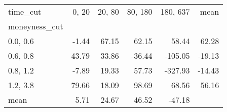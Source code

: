 \begin{tabular}{lrrrrr}
\toprule
time\_cut &  0, 20 &  20, 80 &  80, 180 &  180, 637 &   mean \\
moneyness\_cut &          &           &            &             &        \\
\midrule
0.0, 0.6    &    -1.44 &     67.15 &      62.15 &       58.44 &  62.28 \\
0.6, 0.8    &    43.79 &     33.86 &     -36.44 &     -105.05 & -19.13 \\
0.8, 1.2    &    -7.89 &     19.33 &      57.73 &     -327.93 & -14.43 \\
1.2, 3.8    &    79.66 &     18.09 &      98.69 &       68.56 &  56.16 \\
mean          &     5.71 &     24.67 &      46.52 &      -47.18 &        \\
\bottomrule
\end{tabular}
